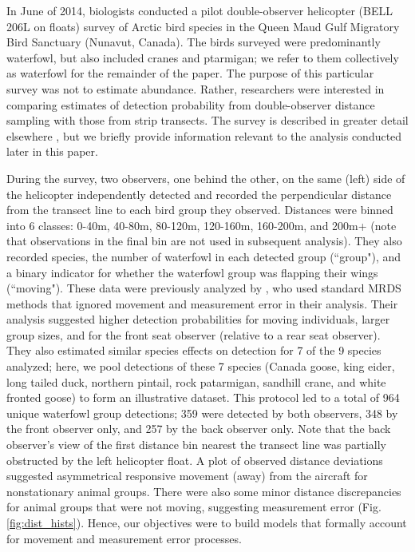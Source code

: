 \documentclass[aoas,preprint]{imsart}
\numberwithin{equation}{section}
\theoremstyle{plain}
\begin{document}
In June of 2014, biologists conducted a pilot double-observer helicopter (BELL 206L on floats) survey of Arctic bird species in the Queen Maud Gulf Migratory Bird Sanctuary (Nunavut, Canada). The birds surveyed were predominantly waterfowl, but also included cranes and ptarmigan; we refer to them collectively as waterfowl for the remainder of the paper. The purpose of this particular survey was not to estimate abundance. Rather, researchers were interested in comparing estimates of detection probability from double-observer distance sampling with those from strip transects.
The survey is described in greater detail elsewhere \citep{AlisauskasConn2017}, but we briefly provide information relevant to the analysis conducted later in this paper.

During the survey, two observers, one behind the other, on the same (left) side of the helicopter independently detected and recorded the perpendicular distance from the transect line to each bird group they observed.  Distances were binned into 6 classes: 0-40m, 40-80m, 80-120m, 120-160m, 160-200m, and 200m+ (note that observations in the final bin are not used in subsequent analysis).  They also recorded species, the number of waterfowl in each detected group (``group"), and a binary indicator for whether the waterfowl group was flapping their wings (``moving").  These data were previously analyzed by \citet{AlisauskasConn2017}, who used standard MRDS methods that ignored movement and measurement error in their analysis.  Their analysis suggested higher detection probabilities for moving individuals, larger group sizes, and for the front seat observer (relative to a rear seat observer).  They also estimated similar species effects on detection for 7 of the 9 species analyzed; here, we pool detections of these 7 species (Canada goose, king eider, long tailed duck, northern pintail, rock patarmigan, sandhill crane, and white fronted goose) to form an illustrative dataset.  This protocol led to a total of 964 unique waterfowl group detections; 359 were detected by both observers, 348 by the front observer only, and 257 by the back observer only.  Note that the back observer's view of the first distance bin nearest the transect line was partially obstructed by the left helicopter float.  A plot of observed distance deviations suggested asymmetrical responsive movement (away) from the aircraft for nonstationary animal groups.  There were also some minor distance discrepancies for animal groups that were not moving, suggesting measurement error (Fig. \ref{fig:dist_hists}).  Hence, our objectives were to build models that formally account for movement and measurement error processes.
\end{document}
